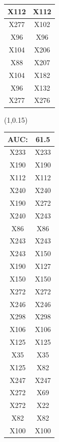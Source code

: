 \documentclass{beamer}
\newcommand{\boz}{\cellcolor{pathwaynode}}
\newcommand{\ghool}{\cellcolor{independentnode}}
\begin{document}
\begin{frame}[plain]
\begin{textblock*}{\paperwidth}
\begin{tabular}{| c c |}
X112   &  X112  \\ \hline
X277   &  X102  \\ \hline
\ghool X96   &  \ghool X96  \\ \hline
X104   &  X206  \\ \hline
\ghool X88   &  X207  \\ \hline
X104   &  X182  \\ \hline
\ghool X96   &  X132  \\ \hline
X277   &  X276  \\ \hline
    \end{tabular}
    \hspace{.5em}
  \end{textblock*}
  \begin{textblock*}{\paperwidth}(1\textwidth,0.15\textheight)
    \raggedright 
    \tiny
    \begin{tabular}{| c c |}
      \hline
AUC: & 61.5 \\ \hline \hline
X233   &  X233  \\ \hline
\boz X190   &  \boz X190  \\ \hline
X112   &  X112  \\ \hline
\boz X240   &  \boz X240  \\ \hline
\boz X190   &  \boz X272  \\ \hline
\boz X240   &  \boz X243  \\ \hline
X86   &  X86  \\ \hline
\boz X243   &  \boz X243  \\ \hline
\boz X243   &  \boz X150  \\ \hline
\boz X190   &  X127  \\ \hline
\boz X150   &  \boz X150  \\ \hline
\boz X272   &  \boz X272  \\ \hline
X246   &  X246  \\ \hline
X298   &  X298  \\ \hline
X106   &  X106  \\ \hline
\boz X125   &  \boz X125  \\ \hline
X35   &  X35  \\ \hline
\boz X125   &  \boz X82  \\ \hline
X247   &  X247  \\ \hline
\boz X272   &  X69  \\ \hline
\boz X272   &  \boz X22  \\ \hline
\boz X82   &  \boz X82  \\ \hline
X100   &  X100  \\ \hline

\end{tabular}
\end{textblock*}
\end{frame}
\end{document}
